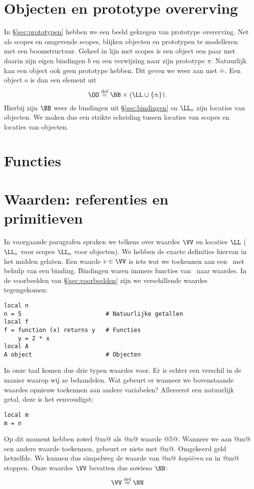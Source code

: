 \section{Objecten en prototype overerving}

In §\ref{sec:prototypen} hebben we een beeld gekregen van prototype overerving. Net als scopes en omgevende scopes, blijken objecten en prototypen te modelleren met een boomstructuur. Geheel in lijn met scopes is een object een paar met daarin zijn eigen bindingen $b$ en een verwijzing naar zijn prototype $\pi$. Natuurlijk kan een object ook geen prototype hebben. Dit geven we weer aan met $\nil$. Een object $o$ is dan een element uit
\begin{equation*}
  \OO \DEF \BB \times (\LL \cup \{\nil\}).
\end{equation*}
Hierbij zijn $\BB$ weer de bindingen uit §\ref{sec:bindingen} en $\LL_o$ zijn locaties van objecten. We maken dus een strikte scheiding tussen locaties van scopes en locaties van objecten.

\section{Functies}

\section{Waarden: referenties en primitieven}
\label{sec:waarden}

In voorgaande paragrafen spraken we telkens over waardes $\VV$ en locaties $\LL$ ($\LL_s$ voor scopes $\LL_o$ voor objecten). We hebben de exacte definities hiervan in het midden gelaten. Een waarde $v\in\VV$ is iets wat we toekennen aan een \Id\ met behulp van een binding. Bindingen waren immers functies van \Id\ naar waardes. In de voorbeelden van §\ref{sec:voorbeelden} zijn we verschillende waardes tegengekomen:
\begin{lstlisting}
local n
n = 5                        # Natuurlijke getallen
local f
f = function (x) returns y   # Functies
    y = 2 * x
local A
A object                     # Objecten
\end{lstlisting}
In onze taal komen dus drie typen waardes voor. Er is echter een verschil in de manier waarop wij ze behandelen. Wat gebeurt er wanneer we bovenstaande waardes opnieuw toekennen aan andere variabelen? Allereerst een natuurlijk getal, deze is het eenvoudigst:
\begin{lstlisting}
local m
m = n
\end{lstlisting}
Op dit moment hebben zowel @m@ als @n@ waarde @5@. Wanneer we aan @m@ een andere waarde toekennen, gebeurt er niets met @n@. Omgekeerd geld hetzelfde. We kunnen dus simpelweg de waarde van @n@ \emph{kopiëren} en in @m@ stoppen. Onze waardes $\VV$ bevatten dus sowieso $\NN$:
\begin{equation*}
  \VV \DEF \NN
\end{equation*}

